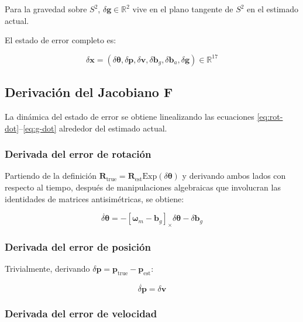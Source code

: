 Para la gravedad sobre $S^2$, $\delta\mathbf{g} \in \mathbb{R}^2$ vive en el plano
tangente de $S^2$ en el estimado actual.

El estado de error completo es:

\begin{equation}
\delta\mathbf{x} = (\delta\boldsymbol{\theta}, \delta\mathbf{p}, \delta\mathbf{v}, \delta\mathbf{b}_g, \delta\mathbf{b}_a, \delta\mathbf{g}) \in \mathbb{R}^{17}
\label{eq:error-state}
\end{equation}

\subsection{Derivación del Jacobiano F}
\label{sec:fej-jacobiano-f}

La dinámica del estado de error se obtiene linealizando las ecuaciones
\eqref{eq:rot-dot}--\eqref{eq:g-dot} alrededor del estimado actual.

\subsubsection{Derivada del error de rotación}

Partiendo de la definición $\mathbf{R}_{\text{true}} = \mathbf{R}_{\text{est}} \mathrm{Exp}(\delta\boldsymbol{\theta})$
y derivando ambos lados con respecto al tiempo, después de manipulaciones
algebraicas que involucran las identidades de matrices antisimétricas, se obtiene:

\begin{equation}
\dot{\delta\boldsymbol{\theta}} = -[\boldsymbol{\omega}_m - \mathbf{b}_g]_\times \delta\boldsymbol{\theta} - \delta\mathbf{b}_g
\label{eq:dtheta-dot}
\end{equation}

\subsubsection{Derivada del error de posición}

Trivialmente, derivando $\delta\mathbf{p} = \mathbf{p}_{\text{true}} - \mathbf{p}_{\text{est}}$:

\begin{equation}
\dot{\delta\mathbf{p}} = \delta\mathbf{v}
\label{eq:dp-dot}
\end{equation}

\subsubsection{Derivada del error de velocidad}

